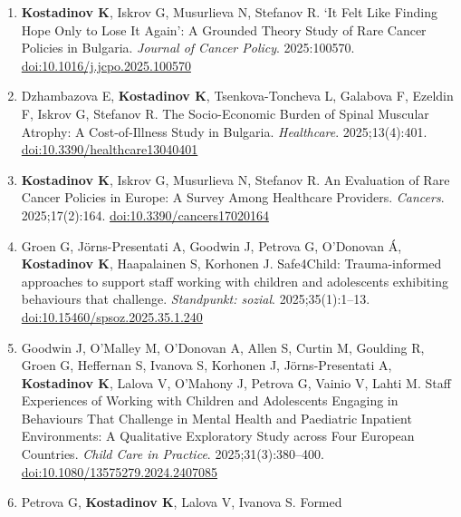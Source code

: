 \documentclass[
  10.5pt,
  a4paper,
  DIV=11,
  numbers=noendperiod]{scrartcl}
\begin{document}
\begin{enumerate}
  Ivanova S, Lagiou A, Lalova V, Makutienė M, Notara V, Ollikkala H,
  Petrova G, Sakellari E, Sukyte D, Laaksonen C. Fostering Mental Health
  Literacy Among Primary School Professionals: Evaluating the Impact of
  an Online Training Program `Well@School'. \emph{International Journal
  of Environmental Research and Public Health}. 2025;22(3):435.
  \href{https://doi.org/10.3390/ijerph22030435}{doi:10.3390/ijerph22030435}
\item
  \textbf{Kostadinov K}, Iskrov G, Musurlieva N, Stefanov R. `It Felt
  Like Finding Hope Only to Lose It Again': A Grounded Theory Study of
  Rare Cancer Policies in Bulgaria. \emph{Journal of Cancer Policy}.
  2025:100570.
  \href{https://doi.org/10.1016/j.jcpo.2025.100570}{doi:10.1016/j.jcpo.2025.100570}
\item
  Dzhambazova E, \textbf{Kostadinov K}, Tsenkova-Toncheva L, Galabova F,
  Ezeldin F, Iskrov G, Stefanov R. The Socio-Economic Burden of Spinal
  Muscular Atrophy: A Cost-of-Illness Study in Bulgaria.
  \emph{Healthcare}. 2025;13(4):401.
  \href{https://doi.org/10.3390/healthcare13040401}{doi:10.3390/healthcare13040401}
\item
  \textbf{Kostadinov K}, Iskrov G, Musurlieva N, Stefanov R. An
  Evaluation of Rare Cancer Policies in Europe: A Survey Among
  Healthcare Providers. \emph{Cancers}. 2025;17(2):164.
  \href{https://doi.org/10.3390/cancers17020164}{doi:10.3390/cancers17020164}
\item
  Groen G, Jörns-Presentati A, Goodwin J, Petrova G, O'Donovan Á,
  \textbf{Kostadinov K}, Haapalainen S, Korhonen J. Safe4Child:
  Trauma-informed approaches to support staff working with children and
  adolescents exhibiting behaviours that challenge. \emph{Standpunkt:
  sozial}. 2025;35(1):1--13.
  \href{https://doi.org/10.15460/spsoz.2025.35.1.240}{doi:10.15460/spsoz.2025.35.1.240}
\item
  Goodwin J, O'Malley M, O'Donovan A, Allen S, Curtin M, Goulding R,
  Groen G, Heffernan S, Ivanova S, Korhonen J, Jörns-Presentati A,
  \textbf{Kostadinov K}, Lalova V, O'Mahony J, Petrova G, Vainio V,
  Lahti M. Staff Experiences of Working with Children and Adolescents
  Engaging in Behaviours That Challenge in Mental Health and Paediatric
  Inpatient Environments: A Qualitative Exploratory Study across Four
  European Countries. \emph{Child Care in Practice}.
  2025;31(3):380--400.
  \href{https://doi.org/10.1080/13575279.2024.2407085}{doi:10.1080/13575279.2024.2407085}
\item
  Petrova G, \textbf{Kostadinov K}, Lalova V, Ivanova S. Formed

\end{enumerate}
\end{document}

